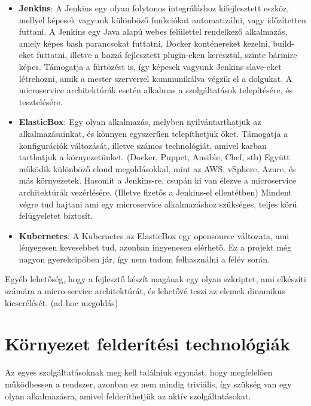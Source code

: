\documentclass[11pt,magyar,a4paper,oneside,]{report}
\begin{document}
\begin{itemize}
\item
  \textbf{Jenkins}\citep{jenkins}: A Jenkins egy olyan folytonos
  integráláshoz kifejlesztett eszköz, mellyel képesek vagyunk különböző
  funkciókat automatizálni, vagy időzítetten futtani. A Jenkins egy Java
  alapú webes felülettel rendelkező alkalmazás, amely képes bash
  parancsokat futtatni, Docker konténereket kezelni, build-eket
  futtatni, illetve a hozzá fejlesztett plugin-eken keresztül, szinte
  bármire képes. Támogatja a fürtözést is, így képesek vagyunk Jenkins
  slave-eket létrehozni, amik a mester szerverrel kommunikálva végzik el
  a dolgukat. A microservice architektúrák esetén alkalmas a
  szolgáltatások telepítésére, és tesztelésére.
\item
  \textbf{ElasticBox}\citep{elasticbox}: Egy olyan alkalmazás, melyben
  nyilvántarthatjuk az alkalmazásainkat, és könnyen egyszerűen
  telepíthetjük őket. Támogatja a konfigurációk változását, illetve
  számos technológiát, amivel karban tarthatjuk a környezetünket.
  (Docker, Puppet, Ansible, Chef, stb) Együtt működik különböző cloud
  megoldásokkal, mint az AWS, vSphere, Azure, és más környezetek.
  Hasonlít a Jenkins-re, csupán ki van élezve a microservice
  architektúrák vezérlésére. (Illetve fizetős a Jenkins-el ellentétben)
  Mindent végre tud hajtani ami egy microservice alkalmazáshoz
  szükséges, teljes körű felügyeletet biztosít.
  \citep{jenkins-elasticbox}
\item
  \textbf{Kubernetes}\citep{kubernetes}: A Kubernetes az ElasticBox egy
  opensource változata, ami lényegesen kevesebbet tud, azonban
  ingyenesen elérhető. Ez a projekt még nagyon gyerekcipőben jár, így
  nem tudom felhasználni a félév során.
\end{itemize}

Egyéb lehetőség, hogy a fejlesztő készít magának egy olyan szkriptet,
ami elkészíti számára a micro-service architektúrát, és lehetővé teszi
az elemek dinamikus kicserélését. (ad-hoc megoldás)

\section{Környezet felderítési
technológiák}\label{kuxf6rnyezet-felderuxedtuxe9si-technoluxf3giuxe1k}

Az egyes szolgáltatásoknak meg kell találniuk egymást, hogy megfelelően
működhessen a rendszer, azonban ez nem mindig triviális, így szükség van
egy olyan alkalmazásra, amivel felderíthetjük az aktív szolgáltatásokat.
\end{document}
